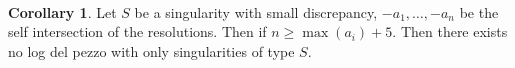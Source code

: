\documentclass[11pt]{report}
\theoremstyle{definition}
\theoremstyle{definition}
\newtheorem{cor}[thm]{Corollary}
\theoremstyle{definition}
\theoremstyle{definition}
\theoremstyle{definition}
\theoremstyle{definition}
\theoremstyle{definition}
\theoremstyle{definition}
\newcommand{\ldp}{log del pezzo }
\newcommand{\polygon}[5][xshift=0cm]{
  \pgfmathsetmacro{\angle}{360/#2}
  \pgfmathsetmacro{\startangle}{-90 + \angle/2}
  \pgfmathsetmacro{\y}{cos(\angle/2)}
  \begin{scope}[#1]
    \foreach \i in {1,2,...,#2} {
      \pgfmathsetmacro{\x}{\startangle + \angle*\i}
      \draw  (\x:2 cm) -- (\x + \angle:2 cm);
	\node (\i) at ( \x + \angle/2, 1.5) {1};
    }
  \end{scope}
}
\begin{document}
\\
\begin{cor}
Let $S$ be a singularity with small discrepancy, $-a_1, \dots , -a_n$ be the self intersection of the resolutions. Then if $n \geq \max (a_i) + 5 $. Then there exists no \ldp with only singularities of type $S$.
\end{cor}
\end{document}
